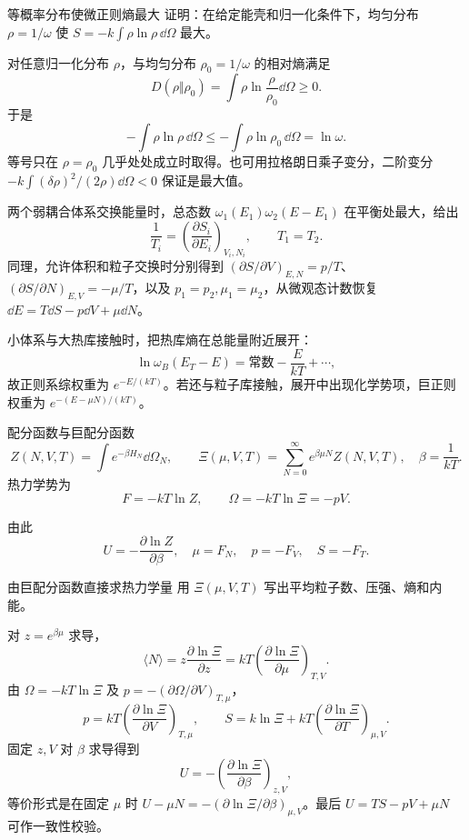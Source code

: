 \begin{advexamplebox}{等概率分布使微正则熵最大}\label{advA2:ex:microcanonical-maximum}
证明：在给定能壳和归一化条件下，均匀分布 $\rho=1/\omega$ 使
$S=-k\int\rho\ln\rho\,\dd\Omega$ 最大。

\AQMicrocanonical
\end{advexamplebox}
\begin{advsolution}
\AAMicrocanonical

对任意归一化分布 $\rho$，与均匀分布 $\rho_0=1/\omega$ 的相对熵满足
\[
 D(\rho\Vert\rho_0)=\int\rho\ln\frac{\rho}{\rho_0}\dd\Omega\ge0.
\]
于是
\[
 -\int\rho\ln\rho\,\dd\Omega
 \le-\int\rho\ln\rho_0\,\dd\Omega=\ln\omega.
\]
等号只在 $\rho=\rho_0$ 几乎处处成立时取得。也可用拉格朗日乘子变分，二阶变分
$-k\int(\delta\rho)^2/(2\rho)\dd\Omega<0$ 保证是最大值。
\end{advsolution}

两个弱耦合体系交换能量时，总态数
$\omega_1(E_1)\omega_2(E-E_1)$ 在平衡处最大，给出
\[
 \frac1{T_i}=\left(\frac{\partial S_i}{\partial E_i}\right)_{V_i,N_i},
 \qquad T_1=T_2.
\]
同理，允许体积和粒子交换时分别得到
$(\partial S/\partial V)_{E,N}=p/T$、
$(\partial S/\partial N)_{E,V}=-\mu/T$，以及
$p_1=p_2,\mu_1=\mu_2$，从微观态计数恢复
$\dd E=T\dd S-p\dd V+\mu\dd N$。

小体系与大热库接触时，把热库熵在总能量附近展开：
\[
 \ln\omega_B(E_T-E)=\text{常数}-\frac{E}{kT}+\cdots,
\]
故正则系综权重为 $e^{-E/(kT)}$。若还与粒子库接触，展开中出现化学势项，巨正则权重为
$e^{-(E-\mu N)/(kT)}$。

\begin{advdefinition}{配分函数与巨配分函数}\label{advA2:def:partition-functions}
\[
 Z(N,V,T)=\int e^{-\beta H_N}\dd\Omega_N,
 \qquad
 \Xi(\mu,V,T)=\sum_{N=0}^\infty e^{\beta\mu N}Z(N,V,T),
 \quad \beta=\frac1{kT}.
\]
热力学势为
\[
 F=-kT\ln Z,
 \qquad
 \Omega=-kT\ln\Xi=-pV.
\]
\end{advdefinition}
由此
\[
 U=-\frac{\partial\ln Z}{\partial\beta},
 \quad
 \mu=F_N,\quad p=-F_V,\quad S=-F_T.
\]

\begin{advexamplebox}{由巨配分函数直接求热力学量}\label{advA2:ex:grand-observables}
用 $\Xi(\mu,V,T)$ 写出平均粒子数、压强、熵和内能。

\AQGrand
\end{advexamplebox}
\begin{advsolution}
\AAGrand

对 $z=e^{\beta\mu}$ 求导，
\[
 \boxed{\langle N\rangle
 =z\frac{\partial\ln\Xi}{\partial z}
 =kT\left(\frac{\partial\ln\Xi}{\partial\mu}\right)_{T,V}}.
\]
由 $\Omega=-kT\ln\Xi$ 及 $p=-(\partial\Omega/\partial V)_{T,\mu}$，
\[
 \boxed{p=kT\left(\frac{\partial\ln\Xi}{\partial V}\right)_{T,\mu}},
 \qquad
 \boxed{S=k\ln\Xi+kT
 \left(\frac{\partial\ln\Xi}{\partial T}\right)_{\mu,V}}.
\]
固定 $z,V$ 对 $\beta$ 求导得到
\[
 \boxed{U=-\left(\frac{\partial\ln\Xi}{\partial\beta}\right)_{z,V}},
\]
等价形式是在固定 $\mu$ 时
$U-\mu N=-(\partial\ln\Xi/\partial\beta)_{\mu,V}$。最后
$U=TS-pV+\mu N$ 可作一致性校验。
\end{advsolution}

